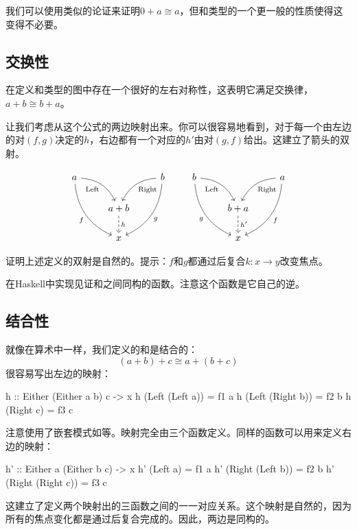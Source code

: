 \documentclass[DaoFP]{subfiles}
\begin{document}
我们可以使用类似的论证来证明$0 + a \cong a$，但和类型的一个更一般的性质使得这变得不必要。
\subsection{交换性}

在定义和类型的图中存在一个很好的左右对称性，这表明它满足交换律，$a + b \cong b + a$。

让我们考虑从这个公式的两边映射出来。你可以很容易地看到，对于每一个由左边的对$(f, g)$决定的$h$，右边都有一个对应的$h'$由对$(g, f)$给出。这建立了箭头的双射。

\[
 \begin{tikzcd}
 a
 \arrow[dr,  bend left, "\text{Left}"']
 \arrow[ddr, bend right, "f"']
 && b
 \arrow[dl, bend right, "\text{Right}"]
 \arrow[ddl, bend left, "g"]
 \\
&a + b
\arrow[d, dashed, "h"]
\\
& x
 \end{tikzcd}
 \qquad
 \begin{tikzcd}
 b
 \arrow[dr,  bend left, "\text{Left}"']
 \arrow[ddr, bend right, "g"']
 && a
 \arrow[dl, bend right, "\text{Right}"]
 \arrow[ddl, bend left, "f"]
 \\
&b + a
\arrow[d, dashed, "h'"]
\\
& x
 \end{tikzcd}
\]

\begin{exercise}
证明上述定义的双射是自然的。提示：$f$和$g$都通过后复合$k \colon x \to y$改变焦点。
\end{exercise}
\begin{exercise}
在Haskell中实现见证和之间同构的函数。注意这个函数是它自己的逆。
\end{exercise}

\subsection{结合性}

就像在算术中一样，我们定义的和是结合的：
\[(a + b) + c \cong a + (b + c) \]
很容易写出左边的映射：
\begin{haskell}
h :: Either (Either a b) c -> x
h (Left (Left a))  = f1 a
h (Left (Right b)) = f2 b
h (Right c)        = f3 c
\end{haskell}
注意使用了嵌套模式如等。映射完全由三个函数定义。同样的函数可以用来定义右边的映射：
\begin{haskell}
h' :: Either a (Either b c) -> x
h' (Left a)          = f1 a
h' (Right (Left b))  = f2 b
h' (Right (Right c)) = f3 c
\end{haskell}
这建立了定义两个映射出的三函数之间的一一对应关系。这个映射是自然的，因为所有的焦点变化都是通过后复合完成的。因此，两边是同构的。
\end{document}
